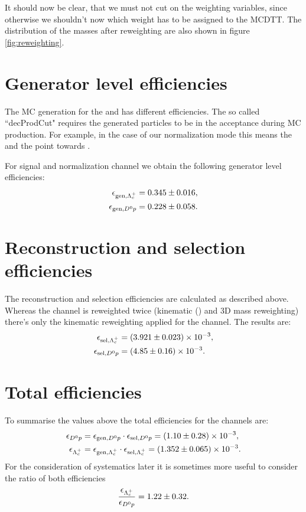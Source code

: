 It should now be clear, that we must not cut on the weighting variables, since otherwise we shouldn't now which weight has to be assigned to the MCDTT. The distribution of the masses after reweighting are also shown in figure \ref{fig:reweighting}.

\section{Generator level efficiencies}
The MC generation for the \LbToDpmunuX and \LbToLcmunu has different efficiencies. The so called ``decProdCut" requires the generated particles to be in the \lhcb acceptance during MC production. 
For example, in the case of our normalization mode \LbToLcmunu this means the \Lc and the \muon point towards \lhcb.

For signal and normalization channel we obtain the following generator level efficiencies:
\begin{align*}
    \effGenLc &= \effGenLcval \pm \effGenLcerr, \\
    \effGenDp &= \effGenDpval \pm \effGenDperr.
\end{align*}

\section{Reconstruction and selection efficiencies}
The reconstruction and selection efficiencies are calculated as described above. Whereas the \Dz\proton channel is reweighted twice (kinematic \pt(\Lb) and 3D mass reweighting) there's only the kinematic reweighting applied for the \Lc channel. The results are:
\begin{align*}
    \effSelLc &= \num[scientific-notation=true]{\effSelLcval \pm \effSelLcerr}, \\
    \effSelDp &= \num[scientific-notation=true]{\effSelDpval \pm \effSelDperr}.
\end{align*}

\section{Total efficiencies}
To summarise the values above the total efficiencies for the channels are:
\begin{align*}
    \effDp &= \effGenDp \cdot \effSelDp = \num[scientific-notation=true]{\effDpval \pm \effDperr}, \\
    \effLc &= \effGenLc \cdot \effSelLc = \num[scientific-notation=true]{\effLcval \pm \effLcerr}.
\end{align*}
For the consideration of systematics later it is sometimes more useful to consider the ratio of both efficiencies
\begin{align*}
    \frac{\effLc}{\effDp} = \effRatioval \pm \effRatioerr.
\end{align*}
